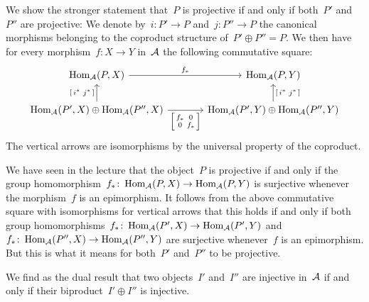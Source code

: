 \section{}

We show the stronger statement that~$P$ is projective if and only if both~$P'$ and~$P''$ are projective:
We denote by~$i \colon P' \to P$ and~$j \colon P'' \to P$ the canonical morphisms belonging to the coproduct structure of~$P' \oplus P'' = P$.
We then have for every morphism~$f \colon X \to Y$ in~$\mathcal{A}$ the following commutative square:
\[
  \begin{tikzcd}[ampersand replacement = \&, column sep = large]
        \Hom_{\Acat}(P, X)
        \arrow{r}[above]{f_*}
    \&  \Hom_{\Acat}(P, Y)
    \\
        \Hom_{\Acat}(P', X) \oplus \Hom_{\Acat}(P'', X)
        \arrow{u}[left]{\begin{bsmallmatrix} i^* & j^* \end{bsmallmatrix}}
        \arrow{r}[below]{\begin{bsmallmatrix} f_* & 0 \\ 0 & f_* \end{bsmallmatrix}}
    \&  \Hom_{\Acat}(P', Y) \oplus \Hom_{\Acat}(P'', Y)
        \arrow{u}[right]{\begin{bsmallmatrix} i^* & j^* \end{bsmallmatrix}}
  \end{tikzcd}
\]
The vertical arrows are isomorphisms by the universal property of the coproduct.

We have seen in the lecture that the object~$P$ is projective if and only if the group homomorphism~$f_* \colon \operatorname{Hom}_{\mathcal{A}}(P,X) \to \operatorname{Hom}_{\mathcal{A}}(P,Y)$ is surjective whenever the morphism~$f$ is an epimorphism.
It follows from the above commutative square with isomorphisms for vertical arrows that this holds if and only if both group homomorphisms~$f_* \colon \operatorname{Hom}_{\mathcal{A}}(P',X) \to \operatorname{Hom}_{\mathcal{A}}(P',Y)$ and~$f_* \colon \operatorname{Hom}_{\mathcal{A}}(P'',X) \to \operatorname{Hom}_{\mathcal{A}}(P'',Y)$ are surjective whenever~$f$ is an epimorphism.
But this is what it means for both~$P'$ and~$P''$ to be projective.

We find as the dual result that two objects~$I'$ and~$I''$ are injective in~$\mathcal{A}$ if and only if their biproduct~$I' \oplus I''$ is injective.

